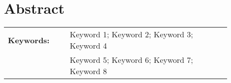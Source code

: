 \section*{Abstract}


\lipsum[1-2]

%
\vfill
%
{\centering %
\begin{tabular}{p{0.25\linewidth} p{0.65\linewidth}}
	\textbf{\Large Keywords:} 	& Keyword 1; Keyword 2; Keyword 3; Keyword 4 \\%
								& Keyword 5; Keyword 6; Keyword 7; Keyword 8 %
\end{tabular}
}